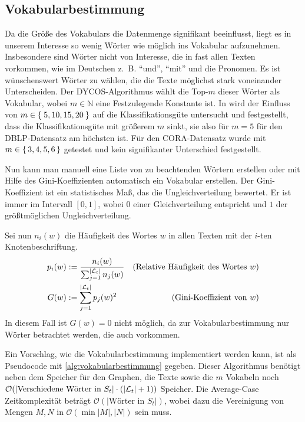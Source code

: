 \subsection{Vokabularbestimmung}\label{sec:vokabularbestimmung}
Da die Größe des Vokabulars die Datenmenge signifikant beeinflusst,
liegt es in unserem Interesse so wenig Wörter wie möglich ins
Vokabular aufzunehmen. Insbesondere sind Wörter nicht von Interesse,
die in fast allen Texten vorkommen, wie im Deutschen z.~B.
\enquote{und}, \enquote{mit} und die Pronomen. Es ist wünschenswert
Wörter zu wählen, die die Texte möglichst stark voneinander Unterscheiden.
Der DYCOS-Algorithmus wählt die Top-$m$ dieser Wörter als Vokabular,
wobei $m \in \mathbb{N}$ eine Festzulegende Konstante ist. In \cite[S. 365]{aggarwal2011}
wird der Einfluss von $m \in \Set{5,10, 15,20}$ auf die Klassifikationsgüte
untersucht und festgestellt, dass die Klassifikationsgüte mit größerem
$m$ sinkt, sie also für $m=5$ für den DBLP-Datensatz am höchsten ist.
Für den CORA-Datensatz wurde mit $m \in \set{3,4,5,6}$ getestet und 
kein signifikanter Unterschied festgestellt.

Nun kann man manuell eine Liste von zu beachtenden Wörtern erstellen
oder mit Hilfe des Gini-Koeffizienten automatisch ein Vokabular erstellen.
Der Gini-Koeffizient ist ein statistisches Maß, das die Ungleichverteilung
bewertet. Er ist immer im Intervall $[0,1]$, wobei $0$ einer 
Gleichverteilung entspricht und $1$ der größtmöglichen Ungleichverteilung.

Sei nun $n_i(w)$ die Häufigkeit des Wortes $w$ in allen Texten mit 
der $i$-ten Knotenbeschriftung.
\begin{align}
    p_i(w) &:= \frac{n_i(w)}{\sum_{j=1}^{|\mathcal{L}_t|} n_j(w)} &\text{(Relative Häufigkeit des Wortes $w$)}\\
    G(w)   &:= \sum_{j=1}^{|\mathcal{L}_t|} p_j(w)^2              &\text{(Gini-Koeffizient von $w$)}
\end{align}
In diesem Fall ist $G(w)=0$ nicht möglich, da zur Vokabularbestimmung
nur Wörter betrachtet werden, die auch vorkommen.

Ein Vorschlag, wie die Vokabularbestimmung implementiert werden kann,
ist als Pseudocode mit \cref{alg:vokabularbestimmung}
gegeben. Dieser Algorithmus benötigt neben dem Speicher für den
Graphen, die Texte sowie die $m$ Vokabeln noch $\mathcal{O}(|\text{Verschiedene Wörter in } S_t| \cdot (|\mathcal{L}_t| + 1))$
Speicher. Die Average-Case Zeitkomplexität beträgt 
$\mathcal{O}(|\text{Wörter in } S_t|)$, wobei dazu die Vereinigung
von Mengen $M,N$ in $\mathcal{O}(\min{|M|, |N|})$ sein muss.


